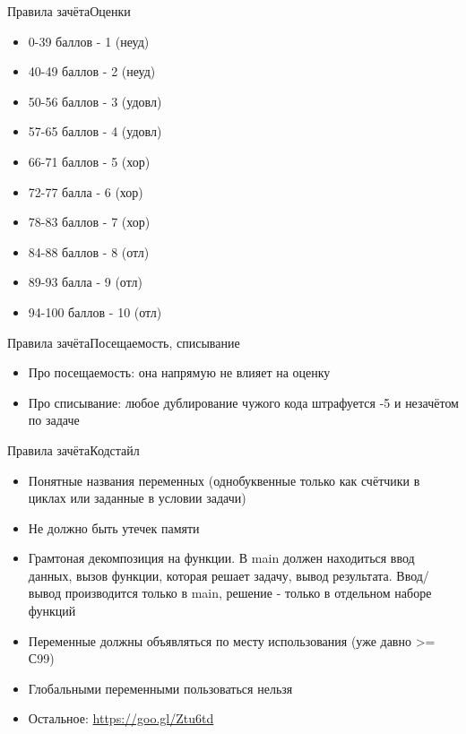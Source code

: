 \documentclass[10pt]{beamer}
\begin{document}
\begin{frame}[fragile]{Правила зачёта}{Оценки}
\begin{itemize}
\item 0-39 баллов - 1 (неуд)
\item 40-49 баллов - 2 (неуд)
\item 50-56 баллов - 3 (удовл)
\item 57-65 баллов - 4 (удовл)
\item 66-71 баллов - 5 (хор)
\item 72-77 балла - 6 (хор)
\item 78-83 баллов - 7 (хор)
\item 84-88 баллов - 8 (отл)
\item 89-93 балла - 9 (отл)
\item 94-100 баллов - 10 (отл)
\end{itemize}
\end{frame}

\begin{frame}[fragile]{Правила зачёта}{Посещаемость, списывание}
\begin{itemize}
\item Про посещаемость: она напрямую не влияет на оценку
\item Про списывание: любое дублирование чужого кода штрафуется -5 и незачётом по задаче
\end{itemize}
\end{frame}

\begin{frame}[fragile]{Правила зачёта}{Кодстайл}
\begin{itemize}
\item Понятные названия переменных (однобуквенные только как счётчики в циклах или заданные в условии задачи)
\item Не должно быть утечек памяти
\item Грамтоная декомпозиция на функции. В main должен находиться ввод данных, вызов функции, которая решает задачу, вывод результата. Ввод/вывод производится только в main, решение - только в отдельном наборе функций
\item Переменные должны объявляться по месту использования (уже давно >= С99)
\item Глобальными переменными пользоваться нельзя
\item Остальное: \href{https://goo.gl/Ztu6td}{https://goo.gl/Ztu6td}
\end{itemize}
\end{frame}
\end{document}
